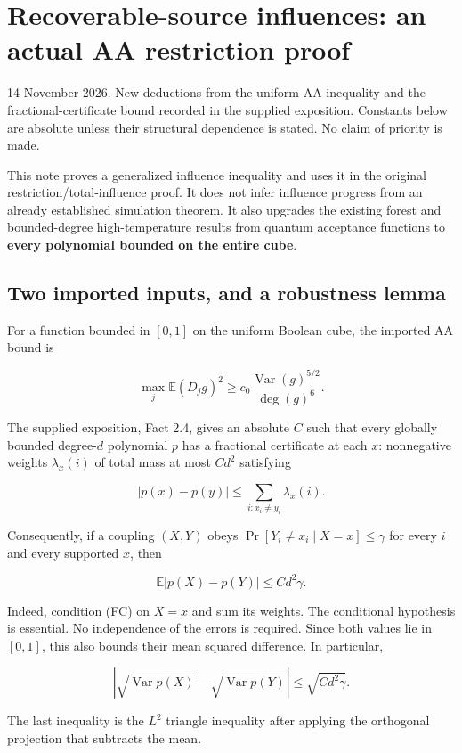 \section{Recoverable-source influences: an actual AA restriction
proof}\label{recoverable-source-influences-an-actual-aa-restriction-proof}

14 November 2026. New deductions from the uniform AA inequality and the
fractional-certificate bound recorded in the supplied exposition.
Constants below are absolute unless their structural dependence is
stated. No claim of priority is made.

This note proves a generalized influence inequality and uses it in the
original restriction/total-influence proof. It does not infer influence
progress from an already established simulation theorem. It also
upgrades the existing forest and bounded-degree high-temperature results
from quantum acceptance functions to \textbf{every polynomial bounded on
the entire cube}.

\subsection{Two imported inputs, and a robustness
lemma}\label{influence-recovery:two-imported-inputs-and-a-robustness-lemma}

For a function bounded in \([0,1]\) on the uniform Boolean cube, the
imported AA bound is

\[
 \max_j \mathbb E(D_jg)^2
 \ge c_0\frac{\operatorname{Var}(g)^{5/2}}{\deg(g)^6}.
 \tag{U}
\]

The supplied exposition, Fact 2.4, gives an absolute \(C\) such that
every globally bounded degree-\(d\) polynomial \(p\) has a fractional
certificate at each \(x\): nonnegative weights \(\lambda_x(i)\) of total
mass at most \(Cd^2\) satisfying

\[
 |p(x)-p(y)|\le\sum_{i:x_i\ne y_i}\lambda_x(i).
 \tag{FC}
\]

Consequently, if a coupling \((X,Y)\) obeys
\(\Pr[Y_i\ne x_i\mid X=x]\le\gamma\) for every \(i\) and every supported
\(x\), then

\[
 \mathbb E|p(X)-p(Y)|\le C d^2\gamma.
 \tag{R}
\]

Indeed, condition (FC) on \(X=x\) and sum its weights. The conditional
hypothesis is essential. No independence of the errors is required.
Since both values lie in \([0,1]\), this also bounds their mean squared
difference. In particular,

\[
 \left|\sqrt{\operatorname{Var}p(X)}-
             \sqrt{\operatorname{Var}p(Y)}\right|
 \le\sqrt{C d^2\gamma}.
 \tag{RV}
\]

The last inequality is the \(L^2\) triangle inequality after applying
the orthogonal projection that subtracts the mean.
